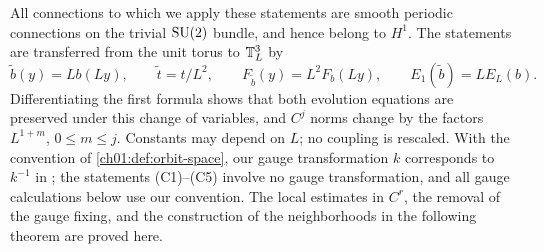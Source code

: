 All connections to which we apply these statements are smooth periodic connections on the trivial $\mathrm{SU}(2)$ bundle, and hence belong to $H^1$. The statements are transferred from the unit torus to $\mathbb T_L^3$ by
\[
 \widetilde b(y)=Lb(Ly),\qquad \widetilde t=t/L^2,\qquad F_{\widetilde b}(y)=L^2F_b(Ly),\qquad E_1(\widetilde b)=LE_L(b).
\]
Differentiating the first formula shows that both evolution equations are preserved under this change of variables, and $C^j$ norms change by the factors $L^{1+m}$, $0\le m\le j$. Constants may depend on $L$; no coupling is rescaled. With the convention of \cref{ch01:def:orbit-space}, our gauge transformation $k$ corresponds to $k^{-1}$ in \cite[(1.1), p.~2]{CCState2023v4}; the statements (C1)--(C5) involve no gauge transformation, and all gauge calculations below use our convention. The local estimates in $C^r$, the removal of the gauge fixing, and the construction of the neighborhoods in the following theorem are proved here.

